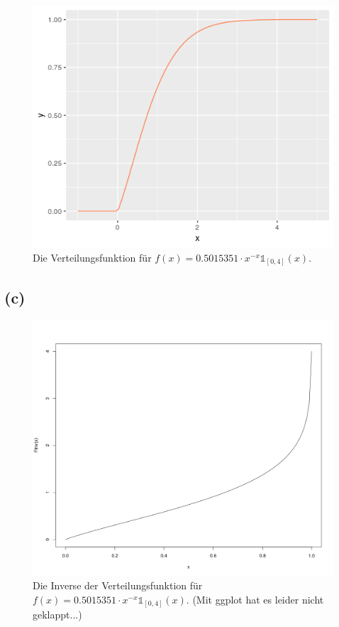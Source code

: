 \documentclass[a4paper]{scrartcl}
\begin{document}
\begin{figure}[H]
	\includegraphics*[scale = 1]{blatt_4_2b.png}
	\caption{Die Verteilungsfunktion für $f(x) = 0.5015351 \cdot x^{-x} \mathds{1}_{\left[0,4\right]}(x)$.}
\end{figure}



\subsection*{(c)}
\begin{figure}[H]
	\includegraphics*[scale = 0.5]{blatt_4_13_c.png}
	\caption{Die Inverse der Verteilungsfunktion für $f(x) = 0.5015351 \cdot x^{-x} \mathds{1}_{\left[0,4\right]}(x)$.
	(Mit ggplot hat es leider nicht geklappt...)}
\end{figure}
\end{document}
